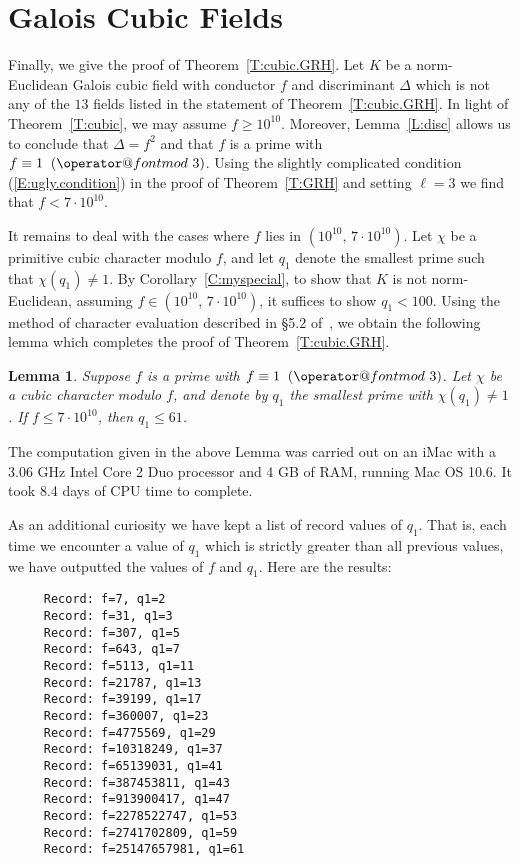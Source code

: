 \documentclass{amsart}
\newtheorem{lemma}[theorem]{Lemma}
\numberwithin{equation}{section}
\numberwithin{table}{section}
\begin{document}
\section{Galois Cubic Fields}\label{S:cubic}

Finally, we give the proof
of Theorem~\ref{T:cubic.GRH}.
Let $K$ be a norm-Euclidean Galois cubic field with conductor $f$ and discriminant $\Delta$
which is not
any of the $13$ fields listed in the statement of Theorem~\ref{T:cubic.GRH}.
In light of Theorem~\ref{T:cubic}, we may assume $f\geq 10^{10}$.
Moreover, Lemma~\ref{L:disc} allows us to conclude that $\Delta=f^2$ and that
$f$ is a prime with $f\equiv 1{\allowbreak\mkern10mu({\operator@font mod}\,\,{3})}$.
Using the
slightly complicated condition (\ref{E:ugly.condition})
in the proof of Theorem~\ref{T:GRH} and setting $\ell=3$ we
find that $f<7\cdot 10^{10}$.

It remains to deal with the cases where
$f$ lies in $(10^{10},\, 7\cdot 10^{10})$.
Let $\chi$ be a primitive cubic character modulo $f$,
and let $q_1$ denote the smallest prime such that $\chi(q_1)\neq 1$.
By Corollary~\ref{C:myspecial}, to show that $K$ is not norm-Euclidean,
assuming $f\in(10^{10},\, 7\cdot 10^{10})$,
it suffices to show $q_1<100$.  Using the method of character evaluation described 
in \S5.2 of~\cite{mcgown:euclidean}, we obtain the following lemma which completes
the proof of Theorem~\ref{T:cubic.GRH}.
\begin{lemma}
Suppose $f$ is a prime with $f\equiv 1{\allowbreak\mkern10mu({\operator@font mod}\,\,{3})}$.
Let $\chi$ be a cubic character modulo $f$,
and denote by $q_1$ the smallest prime with $\chi(q_1)\neq 1$.
If $f\leq 7\cdot 10^{10}$, then $q_1\leq 61$. 
\end{lemma}
The computation given in the above Lemma was carried out on an iMac
with a 3.06 GHz Intel Core 2 Duo processor and 4 GB of RAM, running Mac OS 10.6.
It took 8.4 days of CPU time to complete.

As an additional curiosity we have kept a list of record values of $q_1$.
That is, each time we encounter a value of $q_1$ which is strictly greater than all
previous values, we have outputted the values of $f$ and $q_1$.  Here are the results:

\vspace{1ex}
{\footnotesize
\begin{verbatim}
     Record: f=7, q1=2
     Record: f=31, q1=3
     Record: f=307, q1=5
     Record: f=643, q1=7
     Record: f=5113, q1=11
     Record: f=21787, q1=13
     Record: f=39199, q1=17
     Record: f=360007, q1=23
     Record: f=4775569, q1=29
     Record: f=10318249, q1=37
     Record: f=65139031, q1=41
     Record: f=387453811, q1=43
     Record: f=913900417, q1=47
     Record: f=2278522747, q1=53
     Record: f=2741702809, q1=59
     Record: f=25147657981, q1=61
\end{verbatim}
}
\end{document}
